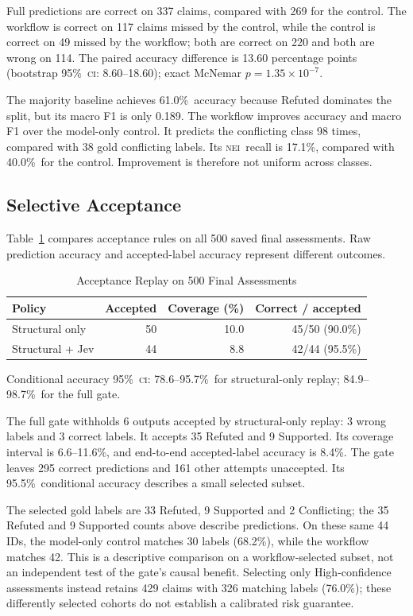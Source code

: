 \documentclass[conference]{IEEEtran}
\newcommand{\NEI}{\textsc{nei}}
\newcommand{\CI}{\textsc{ci}}
\newcommand{\pct}{\%}
\begin{document}
Full predictions are correct on 337 claims, compared with 269 for the control. The workflow is correct on 117 claims missed by the control, while the control is correct on 49 missed by the workflow; both are correct on 220 and both are wrong on 114. The paired accuracy difference is 13.60 percentage points (bootstrap 95\pct\ \CI: 8.60--18.60); exact McNemar \(p=1.35\times 10^{-7}\).

The majority baseline achieves 61.0\pct\ accuracy because Refuted dominates the split, but its macro F1 is only 0.189. The workflow improves accuracy and macro F1 over the model-only control. It predicts the conflicting class 98 times, compared with 38 gold conflicting labels. Its \NEI\ recall is 17.1\pct, compared with 40.0\pct\ for the control. Improvement is therefore not uniform across classes.

\subsection{Selective Acceptance}
Table~\ref{tab:acceptance} compares acceptance rules on all 500 saved final assessments. Raw prediction accuracy and accepted-label accuracy represent different outcomes.

\begin{table}[t]
\caption{Acceptance Replay on 500 Final Assessments}
\label{tab:acceptance}
\centering
\footnotesize
\begin{tabular}{@{}lrrr@{}}
\toprule
Policy & Accepted & Coverage (\pct) & Correct / accepted\\
\midrule
Structural only & 50 & 10.0 & 45/50 (90.0\pct)\\
Structural + Jev & 44 & 8.8 & 42/44 (95.5\pct)\\
\bottomrule
\end{tabular}
\par\smallskip
\parbox{\columnwidth}{\footnotesize Conditional accuracy 95\pct\ \CI: 78.6--95.7\pct\ for structural-only replay; 84.9--98.7\pct\ for the full gate.}
\end{table}

The full gate withholds 6 outputs accepted by structural-only replay: 3 wrong labels and 3 correct labels. It accepts 35 Refuted and 9 Supported. Its coverage interval is 6.6--11.6\pct, and end-to-end accepted-label accuracy is 8.4\pct. The gate leaves 295 correct predictions and 161 other attempts unaccepted. Its 95.5\pct\ conditional accuracy describes a small selected subset.

The selected gold labels are 33 Refuted, 9 Supported and 2 Conflicting; the 35 Refuted and 9 Supported counts above describe predictions. On these same 44 IDs, the model-only control matches 30 labels (68.2\pct), while the workflow matches 42. This is a descriptive comparison on a workflow-selected subset, not an independent test of the gate's causal benefit. Selecting only High-confidence assessments instead retains 429 claims with 326 matching labels (76.0\pct); these differently selected cohorts do not establish a calibrated risk guarantee.
\end{document}
